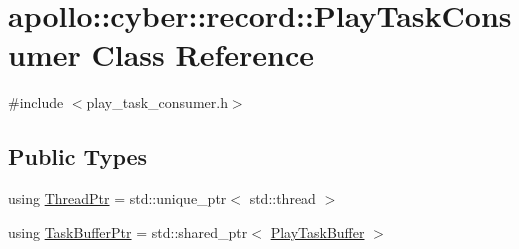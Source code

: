 \hypertarget{classapollo_1_1cyber_1_1record_1_1PlayTaskConsumer}{\section{apollo\-:\-:cyber\-:\-:record\-:\-:Play\-Task\-Consumer Class Reference}
\label{classapollo_1_1cyber_1_1record_1_1PlayTaskConsumer}
}


{\ttfamily \#include $<$play\-\_\-task\-\_\-consumer.\-h$>$}

\subsection*{Public Types}
\begin{DoxyCompactItemize}
\item 
using \hyperlink{classapollo_1_1cyber_1_1record_1_1PlayTaskConsumer_afb48697be572010d788d1fa66e4aaa1f}{Thread\-Ptr} = std\-::unique\-\_\-ptr$<$ std\-::thread $>$
\item 
using \hyperlink{classapollo_1_1cyber_1_1record_1_1PlayTaskConsumer_aaec143d18559ee0406ab272d8cbaab2e}{Task\-Buffer\-Ptr} = std\-::shared\-\_\-ptr$<$ \hyperlink{classapollo_1_1cyber_1_1record_1_1PlayTaskBuffer}{Play\-Task\-Buffer} $>$
\end{DoxyCompactItemize}
